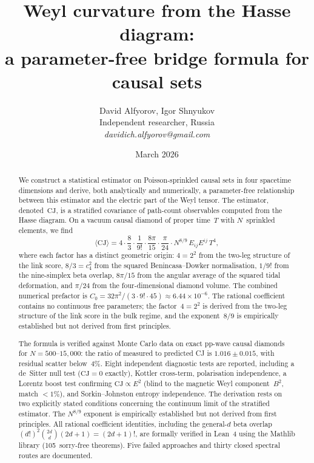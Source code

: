 \documentclass[12pt,a4paper]{article}
\title{Weyl curvature from the Hasse diagram:\\
a parameter-free bridge formula for causal sets}
\author{David Alfyorov, Igor Shnyukov\\[4pt]
\small Independent researcher, Russia\\[2pt]
\small\textit{davidich.alfyorov@gmail.com}}
\date{March 2026}
\theoremstyle{plain}
\theoremstyle{definition}
\theoremstyle{remark}
\newcommand{\Esq}{E_{ij}E^{ij}}
\newcommand{\CJ}{\mathrm{CJ}}
\begin{document}
\maketitle

\begin{abstract}

We construct a statistical estimator on Poisson-sprinkled causal
sets in four spacetime dimensions and derive, both analytically
and numerically, a parameter-free relationship between this
estimator and the electric part of the Weyl tensor.  The
estimator, denoted~$\CJ$, is a stratified covariance of
path-count observables computed from the Hasse diagram.  On a
vacuum causal diamond of proper time~$T$ with $N$~sprinkled
elements, we find
\begin{equation}\label{eq:bridge-abstract}
  \langle \CJ \rangle
  = 4 \cdot \frac{8}{3} \cdot \frac{1}{9!}
    \cdot \frac{8\pi}{15} \cdot \frac{\pi}{24}
    \cdot N^{8/9}\, \Esq\, T^4,
\end{equation}
where each factor has a distinct geometric origin: $4 = 2^2$
from the two-leg structure of the link score, $8/3 = c_4^2$
from the squared Benincasa--Dowker normalisation, $1/9!$ from
the nine-simplex beta overlap, $8\pi/15$ from the angular
average of the squared tidal deformation, and $\pi/24$ from
the four-dimensional diamond volume.  The combined numerical
prefactor is $C_0 = 32\pi^2/(3 \cdot 9! \cdot 45)
\approx 6.44 \times 10^{-6}$.  The rational coefficient contains no continuous free parameters;
the factor~$4 = 2^2$ is derived from the two-leg structure of the
link score in the bulk regime, and the exponent~$8/9$ is
empirically established but not derived from first principles.

The formula is verified against Monte Carlo data on exact pp-wave
causal diamonds for $N = 500$--$15{,}000$: the ratio of measured
to predicted CJ is $1.016 \pm 0.015$, with residual scatter
below~$4\%$.  Eight independent diagnostic tests are reported,
including a de~Sitter null test ($\CJ = 0$ exactly), Kottler
cross-term, polarisation independence, a Lorentz boost test
confirming $\CJ \propto E^2$ (blind to the magnetic Weyl
component~$B^2$, match $< 1\%$), and Sorkin--Johnston entropy
independence.  The derivation rests on two explicitly stated
conditions concerning the continuum limit of the stratified
estimator.  The $N^{8/9}$ exponent is empirically established
but not derived from first principles.  All rational coefficient
identities, including the general-$d$ beta overlap
$(d!)^2\binom{2d}{d}(2d+1) = (2d+1)!$, are formally verified
in Lean~4 using the Mathlib library (105~sorry-free theorems).
Five failed approaches and thirty closed spectral routes are
documented.

\end{abstract}
\end{document}
